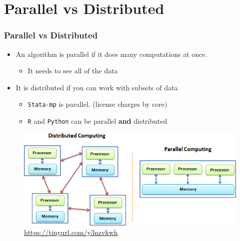 \documentclass[
  shownotes,
  xcolor={svgnames},
  hyperref={colorlinks,citecolor=DarkBlue,linkcolor=DarkRed,urlcolor=DarkBlue}
  , aspectratio=169]{beamer}
\begin{document}
\section{Parallel vs Distributed}
\begin{frame}
\frametitle{Parallel vs Distributed}

\begin{itemize}
\item An algorithm is parallel if it does many computations at once. 
\begin{itemize}
  \item It needs to see all of the data
\end{itemize}
\medskip
\item It is distributed if you can work with subsets of data
\begin{itemize}
  \item \texttt{Stata-mp} is parallel. (license charges by core)
  \item \texttt{R} and \texttt{Python} can be parallel {\bf and} distributed
  \end{itemize}
\end{itemize}


\begin{figure}[H] \centering
  \centering
  \includegraphics[scale=0.65]{figures/distributed_parallel.png}
  \\
  \tiny \url{https://tinyurl.com/y3nzvkwh}
\end{figure}


\end{frame}
\end{document}
